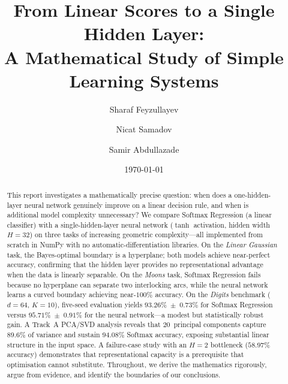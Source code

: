 \documentclass[11pt]{article}
\title{\textbf{From Linear Scores to a Single Hidden Layer:\\
A Mathematical Study of Simple Learning Systems}}
\author{Sharaf Feyzullayev \and Nicat Samadov \and Samir Abdullazade}
\date{\today}
\begin{document}
\maketitle

\begin{abstract}
This report investigates a mathematically precise question: when does a one-hidden-layer
neural network genuinely improve on a linear decision rule, and when is additional model
complexity unnecessary?  We compare Softmax Regression (a linear classifier) with a
single-hidden-layer neural network ($\tanh$ activation, hidden width $H{=}32$) on three tasks
of increasing geometric complexity---all implemented from scratch in NumPy with no
automatic-differentiation libraries.  On the \emph{Linear Gaussian} task, the Bayes-optimal
boundary is a hyperplane; both models achieve near-perfect accuracy, confirming that the
hidden layer provides no representational advantage when the data is linearly separable.
On the \emph{Moons} task, Softmax Regression fails because no hyperplane can separate two
interlocking arcs, while the neural network learns a curved boundary achieving near-$100\%$
accuracy.  On the \emph{Digits} benchmark ($d{=}64$, $K{=}10$), five-seed evaluation yields
$93.26\%\;\pm\;0.73\%$ for Softmax Regression versus $95.71\%\;\pm\;0.91\%$ for the neural
network---a modest but statistically robust gain.  A Track~A PCA/SVD analysis reveals that
20~principal components capture $89.6\%$ of variance and sustain $94.08\%$ Softmax accuracy,
exposing substantial linear structure in the input space.  A failure-case study with an
$H{=}2$ bottleneck ($58.97\%$ accuracy) demonstrates that representational capacity is a
prerequisite that optimisation cannot substitute.  Throughout, we derive the mathematics
rigorously, argue from evidence, and identify the boundaries of our conclusions.
\end{abstract}
\end{document}
